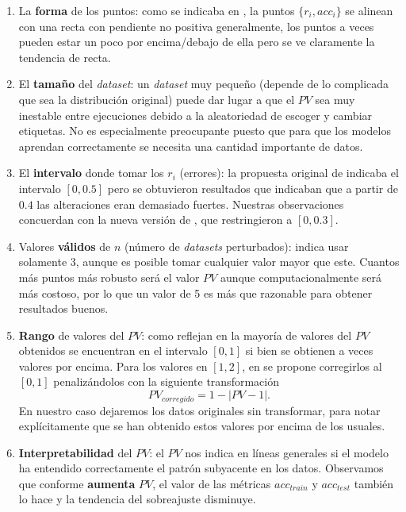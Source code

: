 \begin{enumerate}
  \item La \textbf{forma} de los puntos: como se indicaba en \cite{zhang2019perturbation}, la puntos $\{r_i, acc_i\}$ se alinean con una recta con pendiente no positiva generalmente, los puntos a veces pueden estar un poco por encima/debajo de ella pero se ve claramente la tendencia de recta.

  \item El \textbf{tamaño} del \emph{dataset}: un \emph{dataset} muy pequeño (depende de lo complicada que sea la distribución original) puede dar lugar a que el $PV$ sea muy inestable entre ejecuciones debido a la aleatoriedad de escoger y cambiar etiquetas. No es especialmente preocupante puesto que para que los modelos aprendan correctamente se necesita una cantidad importante de datos.

  \item El \textbf{intervalo} donde tomar los $r_i$ (errores): la propuesta original de \cite{zhang2019perturbation} indicaba el intervalo $[0, 0.5]$ pero se obtuvieron resultados que indicaban que a partir de $0.4$ las alteraciones eran demasiado fuertes. Nuestras observaciones concuerdan con la nueva versión de \cite{zhang2019perturbation}, que restringieron a $[0, 0.3]$.

  \item Valores \textbf{válidos} de $n$ (número de \emph{datasets} perturbados): \cite{zhang2019perturbation} indica usar solamente 3, aunque es posible tomar cualquier valor mayor que este. Cuantos más puntos más robusto será el valor $PV$ aunque computacionalmente será más costoso, por lo que un valor de 5 es más que razonable para obtener resultados buenos.

  \item \textbf{Rango} de valores del $PV$: como reflejan en \cite{zhang2019perturbation} la mayoría de valores del $PV$ obtenidos se encuentran en el intervalo $[0, 1]$ si bien se obtienen a veces valores por encima. Para los valores en $[1, 2]$, en \cite{zhang2019perturbation} se propone corregirlos al $[0, 1]$ penalizándolos con la siguiente transformación
  \begin{equation}
    PV_{corregido} = 1 - |PV - 1|.
    \label{eq:pv-penalizacion}
  \end{equation}
  En nuestro caso dejaremos los datos originales sin transformar, para notar explícitamente que se han obtenido estos valores por encima de los usuales.

  \item \textbf{Interpretabilidad} del $PV$: el $PV$ nos indica en líneas generales si el modelo ha entendido correctamente el patrón subyacente en los datos. Observamos que conforme \textbf{aumenta} $PV$, el valor de las métricas $acc_{train}$ y $acc_{test}$ también lo hace y la tendencia del sobreajuste disminuye.


\end{enumerate}
